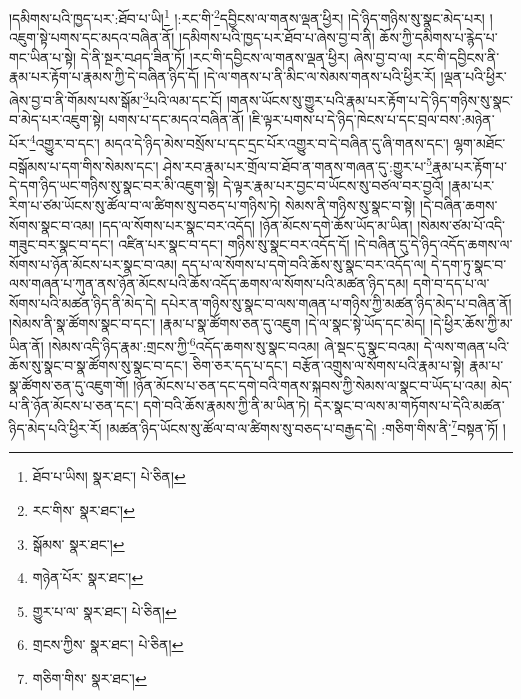 །དམིགས་པའི་ཁྱད་པར་:ཐོབ་པ་ཡི།\footnote{ཐོབ་པ་ཡིས།  སྣར་ཐང་།  པེ་ཅིན། } །:རང་གི་\footnote{རང་གིས་  སྣར་ཐང་། }དབྱིངས་ལ་གནས་ལྡན་ཕྱིར། །དེ་ཉིད་གཉིས་སུ་སྣང་མེད་པར། །འཇུག་སྟེ་པགས་དང་མདའ་བཞིན་ནོ། །དམིགས་པའི་ཁྱད་པར་ཐོབ་པ་ཞེས་བྱ་བ་ནི། ཆོས་ཀྱི་དམིགས་པ་རྙེད་པ་གང་ཡིན་པ་སྟེ། དེ་ནི་སྔར་བཤད་ཟིན་ཏོ། །རང་གི་དབྱིངས་ལ་གནས་ལྡན་ཕྱིར། ཞེས་བྱ་བ་ལ། རང་གི་དབྱིངས་ནི་རྣམ་པར་རྟོག་པ་རྣམས་ཀྱི་དེ་བཞིན་ཉིད་དོ། །དེ་ལ་གནས་པ་ནི་མིང་ལ་སེམས་གནས་པའི་ཕྱིར་རོ། །ལྡན་པའི་ཕྱིར་ཞེས་བྱ་བ་ནི་གོམས་པས་སྒོམ་\footnote{སྒོམས་  སྣར་ཐང་། }པའི་ལམ་དང་ངོ། །གནས་ཡོངས་སུ་གྱུར་པའི་རྣམ་པར་རྟོག་པ་དེ་ཉིད་གཉིས་སུ་སྣང་བ་མེད་པར་འཇུག་སྟེ། པགས་པ་དང་མདའ་བཞིན་ནོ། །ཇི་ལྟར་པགས་པ་དེ་ཉིད་ཁེངས་པ་དང་བྲལ་བས་:མཉེན་པོར་\footnote{གཉེན་པོར་  སྣར་ཐང་། }འགྱུར་བ་དང་། མདའ་དེ་ཉིད་མེས་བསྲོས་པ་དང་དྲང་པོར་འགྱུར་བ་དེ་བཞིན་དུ་ཞི་གནས་དང་། ལྷག་མཐོང་བསྒོམས་པ་དག་གིས་སེམས་དང་། ཤེས་རབ་རྣམ་པར་གྲོལ་བ་ཐོབ་ན་གནས་གཞན་དུ་:གྱུར་པ་\footnote{གྱུར་པ་ལ་  སྣར་ཐང་།  པེ་ཅིན། }རྣམ་པར་རྟོག་པ་དེ་དག་ཉིད་ཡང་གཉིས་སུ་སྣང་བར་མི་འཇུག་སྟེ། དེ་ལྟར་རྣམ་པར་བྱང་བ་ཡོངས་སུ་བཙལ་བར་བྱའོ། །རྣམ་པར་རིག་པ་ཙམ་ཡོངས་སུ་ཚོལ་བ་ལ་ཚིགས་སུ་བཅད་པ་གཉིས་ཏེ། སེམས་ནི་གཉིས་སུ་སྣང་བ་སྟེ། །དེ་བཞིན་ཆགས་སོགས་སྣང་བ་འམ། །དད་ལ་སོགས་པར་སྣང་བར་འདོད། །ཉོན་མོངས་དགེ་ཆོས་ཡོད་མ་ཡིན། །སེམས་ཙམ་པོ་འདི་གཟུང་བར་སྣང་བ་དང་། འཛིན་པར་སྣང་བ་དང་། གཉིས་སུ་སྣང་བར་འདོད་དོ། །དེ་བཞིན་དུ་དེ་ཉིད་འདོད་ཆགས་ལ་སོགས་པ་ཉོན་མོངས་པར་སྣང་བ་འམ། དད་པ་ལ་སོགས་པ་དགེ་བའི་ཆོས་སུ་སྣང་བར་འདོད་ལ། དེ་དག་ཏུ་སྣང་བ་ལས་གཞན་པ་ཀུན་ནས་ཉོན་མོངས་པའི་ཆོས་འདོད་ཆགས་ལ་སོགས་པའི་མཚན་ཉིད་དམ། དགེ་བ་དད་པ་ལ་སོགས་པའི་མཚན་ཉིད་ནི་མེད་དེ། དཔེར་ན་གཉིས་སུ་སྣང་བ་ལས་གཞན་པ་གཉིས་ཀྱི་མཚན་ཉིད་མེད་པ་བཞིན་ནོ། །སེམས་ནི་སྣ་ཚོགས་སྣང་བ་དང་། །རྣམ་པ་སྣ་ཚོགས་ཅན་དུ་འཇུག །དེ་ལ་སྣང་སྟེ་ཡོད་དང་མེད། །དེ་ཕྱིར་ཆོས་ཀྱི་མ་ཡིན་ནོ། །སེམས་འདི་ཉིད་རྣམ་:གྲངས་ཀྱི་\footnote{གྲངས་ཀྱིས་  སྣར་ཐང་།  པེ་ཅིན། }འདོད་ཆགས་སུ་སྣང་བའམ། ཞེ་སྡང་དུ་སྣང་བའམ། དེ་ལས་གཞན་པའི་ཆོས་སུ་སྣང་བ་སྣ་ཚོགས་སུ་སྣང་བ་དང་། ཅིག་ཅར་དད་པ་དང་། བརྩོན་འགྲུས་ལ་སོགས་པའི་རྣམ་པ་སྟེ། རྣམ་པ་སྣ་ཚོགས་ཅན་དུ་འཇུག་གོ། །ཉོན་མོངས་པ་ཅན་དང་དགེ་བའི་གནས་སྐབས་ཀྱི་སེམས་ལ་སྣང་བ་ཡོད་པ་འམ། མེད་པ་ནི་ཉོན་མོངས་པ་ཅན་དང་། དགེ་བའི་ཆོས་རྣམས་ཀྱི་ནི་མ་ཡིན་ཏེ། དེར་སྣང་བ་ལས་མ་གཏོགས་པ་དེའི་མཚན་ཉིད་མེད་པའི་ཕྱིར་རོ། །མཚན་ཉིད་ཡོངས་སུ་ཚོལ་བ་ལ་ཚིགས་སུ་བཅད་པ་བརྒྱད་དེ། :གཅིག་གིས་ནི་\footnote{གཅིག་གིས་  སྣར་ཐང་། }བསྟན་ཏོ། །
